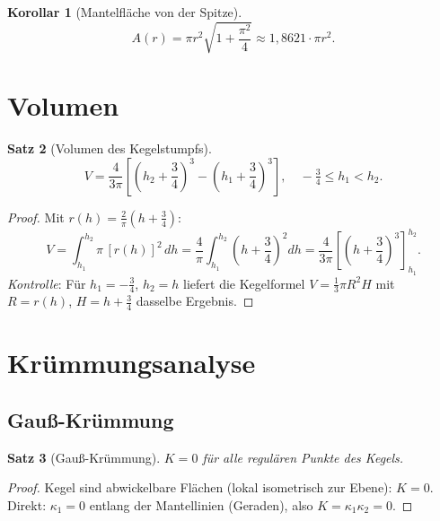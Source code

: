 \documentclass[12pt,a4paper]{article}
\theoremstyle{plain}
\newtheorem{satz}{Satz}[section]
\newtheorem{korollar}[satz]{Korollar}
\theoremstyle{definition}
\theoremstyle{remark}
\begin{document}
\begin{korollar}[Mantelfl\"{a}che von der Spitze]\label{kor:mantelflaeche}
\begin{equation}\label{eq:mantelspitze}
A(r) = \pi r^2\sqrt{1+\frac{\pi^2}{4}} \approx 1{,}8621\cdot\pi r^2.
\end{equation}
\end{korollar}

\section{Volumen}

\begin{satz}[Volumen des Kegelstumpfs]\label{satz:volumen}
\begin{equation}\label{eq:volumen}
V = \frac{4}{3\pi}\left[\left(h_2+\frac{3}{4}\right)^3 - \left(h_1+\frac{3}{4}\right)^3\right],
\quad -\tfrac{3}{4}\leq h_1 < h_2.
\end{equation}
\end{satz}

\begin{proof}
Mit $r(h) = \tfrac{2}{\pi}(h+\tfrac{3}{4})$:
\[
V = \int_{h_1}^{h_2}\pi\,[r(h)]^2\,dh
= \frac{4}{\pi}\int_{h_1}^{h_2}\!\!\left(h+\frac{3}{4}\right)^2 dh
= \frac{4}{3\pi}\!\left[\left(h+\frac{3}{4}\right)^3\right]_{h_1}^{h_2}.
\]
\textit{Kontrolle}: F\"{u}r $h_1=-\tfrac{3}{4}$, $h_2=h$ liefert die Kegelformel
$V = \tfrac{1}{3}\pi R^2 H$ mit $R = r(h)$, $H = h+\tfrac{3}{4}$ dasselbe Ergebnis.
\end{proof}

\section{Kr\"{u}mmungsanalyse}

\subsection{Gau\ss-Kr\"{u}mmung}

\begin{satz}[Gau\ss-Kr\"{u}mmung]\label{satz:gauss}
$K = 0$ f\"{u}r alle regul\"{a}ren Punkte des Kegels.
\end{satz}

\begin{proof}
Kegel sind abwickelbare Fl\"{a}chen (lokal isometrisch zur Ebene): $K=0$.
Direkt: $\kappa_1 = 0$ entlang der Mantellinien (Geraden), also $K=\kappa_1\kappa_2=0$.
\end{proof}
\end{document}
